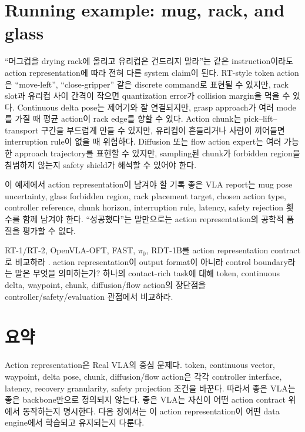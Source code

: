 \section{Running example: mug, rack, and glass}

``머그컵을 drying rack에 올리고 유리컵은 건드리지 말라''는 같은 instruction이라도 action representation에 따라 전혀 다른 system claim이 된다. RT-style token action은 ``move-left'', ``close-gripper'' 같은 discrete command로 표현될 수 있지만, rack slot과 유리컵 사이 간격이 작으면 quantization error가 collision margin을 먹을 수 있다. Continuous delta pose는 제어기와 잘 연결되지만, grasp approach가 여러 mode를 가질 때 평균 action이 rack edge를 향할 수 있다. Action chunk는 pick--lift--transport 구간을 부드럽게 만들 수 있지만, 유리컵이 흔들리거나 사람이 끼어들면 interruption rule이 없을 때 위험하다. Diffusion 또는 flow action expert는 여러 가능한 approach trajectory를 표현할 수 있지만, sampling된 chunk가 forbidden region을 침범하지 않는지 safety shield가 해석할 수 있어야 한다.

\begin{definitionbox}{이 예제에서 action representation이 남겨야 할 기록}
좋은 VLA report는 mug pose uncertainty, glass forbidden region, rack placement target, chosen action type, controller reference, chunk horizon, interruption rule, latency, safety rejection 횟수를 함께 남겨야 한다. ``성공했다''는 말만으로는 action representation의 공학적 품질을 평가할 수 없다.
\end{definitionbox}

\chapterwork
{RT-1/RT-2, OpenVLA-OFT, FAST, $\pi_0$, RDT-1B를 action representation contract로 비교하라 \cite{rt12022,rt22023,openvlaoft2025,fast2025,pi02024,rdt1b2024}.}
{action representation이 output format이 아니라 control boundary라는 말은 무엇을 의미하는가?}
{하나의 contact-rich task에 대해 token, continuous delta, waypoint, chunk, diffusion/flow action의 장단점을 controller/safety/evaluation 관점에서 비교하라.}

\section{요약}

Action representation은 Real VLA의 중심 문제다. token, continuous vector, waypoint, delta pose, chunk, diffusion/flow action은 각각 controller interface, latency, recovery granularity, safety projection 조건을 바꾼다. 따라서 좋은 VLA는 좋은 backbone만으로 정의되지 않는다. 좋은 VLA는 자신이 어떤 action contract 위에서 동작하는지 명시한다. 다음 장에서는 이 action representation이 어떤 data engine에서 학습되고 유지되는지 다룬다.
